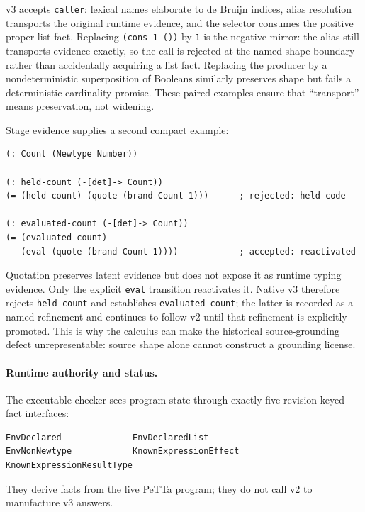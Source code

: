 \documentclass[11pt]{article}
\newcommand{\code}[1]{\texttt{#1}}
\newcommand{\PeTTa}{\textup{PeTTa}}
\begin{document}
v3 accepts \code{caller}: lexical names elaborate to de Bruijn indices,
alias resolution transports the original runtime evidence, and the selector
consumes the positive proper-list fact.  Replacing
\code{(cons 1 ())} by \code{1} is the negative mirror: the alias still
transports evidence exactly, so the call is rejected at the named shape
boundary rather than accidentally acquiring a list fact.  Replacing the
producer by a nondeterministic superposition of Booleans similarly preserves
shape but fails a deterministic cardinality promise.  These paired examples
ensure that ``transport'' means preservation, not widening.

Stage evidence supplies a second compact example:

\begin{lstlisting}
(: Count (Newtype Number))

(: held-count (-[det]-> Count))
(= (held-count) (quote (brand Count 1)))      ; rejected: held code

(: evaluated-count (-[det]-> Count))
(= (evaluated-count)
   (eval (quote (brand Count 1))))            ; accepted: reactivated
\end{lstlisting}

Quotation preserves latent evidence but does not expose it as runtime typing
evidence.  Only the explicit \code{eval} transition reactivates it.  Native
v3 therefore rejects \code{held-count} and establishes
\code{evaluated-count}; the latter is recorded as a named refinement and
continues to follow v2 until that refinement is explicitly promoted.  This is
why the calculus can make the historical source-grounding defect
unrepresentable: source shape alone cannot construct a grounding license.

\paragraph{Runtime authority and status.}
The executable checker sees program state through exactly five
revision-keyed fact interfaces:
\begin{lstlisting}
EnvDeclared              EnvDeclaredList
EnvNonNewtype            KnownExpressionEffect
KnownExpressionResultType
\end{lstlisting}
They derive facts from the live \PeTTa{} program; they do not call v2 to
manufacture v3 answers.
\end{document}
